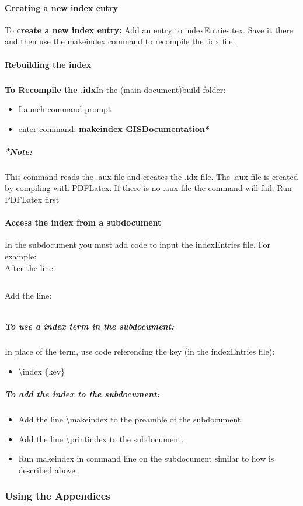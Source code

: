 \documentclass[class=book , crop=false]{standalone}
\begin{document}
\paragraph{Creating a new index entry}
To \textbf{create a new index entry:} Add an entry to indexEntries.tex.  Save it there and then use the makeindex command to recompile the .idx file.

\paragraph{Rebuilding the index}
\subparagraph*{}\textbf{To Recompile the .idx}In the (main document)build folder:
\begin{itemize}
\item Launch command prompt
\item enter command: \textbf{{\large makeindex GISDocumentation*}}
\end{itemize}
\subparagraph{*Note:} {\footnotesize This command reads the .aux file and creates the .idx file.  The .aux file is created by compiling with PDFLatex.  If there is no .aux file the command will fail. Run PDFLatex first}

\paragraph{Access the index from a subdocument}
In the subdocument you must add code to input the indexEntries file.  For example:\\
After the line:
\begin{verbatim}

\end{verbatim}
Add the line:
\begin{verbatim}

\end{verbatim}

\subparagraph[Using an index term]{To use a index term in the subdocument:\texorpdfstring{\\}{}}
In place of the term, use code referencing the key (in the indexEntries file):

\begin{itemize}
\item \textbackslash index \{key\}
\end{itemize}

\subparagraph{To add the index to the subdocument:}
\begin{itemize}
\item Add the line \textbackslash makeindex to the preamble of the subdocument.
\item Add the line \textbackslash printindex to the subdocument.
\item Run makeindex in command line on the subdocument similar to how is described above.

\end{itemize}


\subsubsection[Using the Appendices]{{\Large Using the Appendices}}
\end{document}
